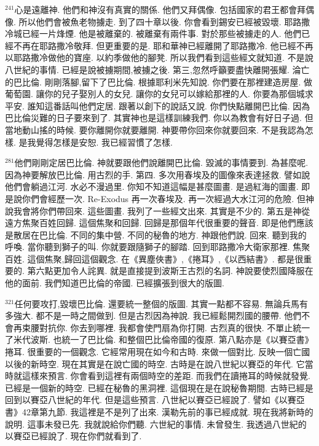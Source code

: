 \documentclass{book}
\begin{document}
$^{241}$心是遠離神.
他們和神沒有真實的關係.
他們又拜偶像.
包括國家的君王都會拜偶像.
所以他們會被魚老物擄走.
到了四十章以後.
你會看到錫安已經被毀壞.
耶路撒冷城已經一片烽煙.
他是被離棄的.
被離棄有兩件事.
對於那些被擄走的人.
他們已經不再在耶路撒冷敬拜.
但更重要的是.
耶和華神已經離開了耶路撒冷.
他已經不再以耶路撒冷做他的寶座.
以約季做他的腳凳.
所以我們看到這些經文就知道.
不是說八世紀的事情.
已經是說被擄期間,被擄之後.
第三,忽然呼籲要盡快離開張耀.
淪亡的巴比倫.
剛剛落腳,留下了巴比倫.
根據耶利米先知說.
你們要在那裡建造房屋.
做葡萄園.
讓你的兒子娶別人的女兒.
讓你的女兒可以嫁給那裡的人.
你要為那個城求平安.
誰知這番話叫他們定居.
跟著以創下的說話又說.
你們快點離開巴比倫.
因為巴比倫災難的日子要來到了.
其實神也是這樣訓練我們.
你以為教會有好日子過.
但當地動山搖的時候.
要你離開你就要離開.
神要帶你回來你就要回來.
不是我認為怎樣.
是我覺得怎樣是安恕.
我已經習慣了怎樣.

$^{281}$他們剛剛定居巴比倫.
神就要跟他們說離開巴比倫.
毀滅的事情要到.
為甚麼呢.
因為神要解放巴比倫.
用古烈的手.
第四.
多次用春埃及的圖像來表達拯救.
譬如說他們會躺過江河.
水必不漫過里.
你知不知道這幅是甚麼圖畫.
是過紅海的圖畫.
即是說你們會經歷一次.
Re-Exodus 再一次春埃及.
再一次經過大水江河的危險.
但神說我會將你們帶回來.
這些圖畫.
我列了一些經文出來.
其實是不少的.
第五是神從遠方焦聚百姓回歸.
這個焦聚和回歸.
回歸是那個年代很重要的聲音.
即是他們應該是散居在巴比倫.
不同的集中營.
不同的秘魯的地方.
神跟他們說.
回來.
聽到我的呼喚.
當你聽到獅子的叫.
你就要跟隨獅子的腳踏.
回到耶路撒冷大衛家那裡.
焦聚百姓.
這個焦聚,歸回這個觀念.
在《異塵俠書》,《捲耳》,《以西結書》.
都是很重要的.
第六點更加令人詫異.
就是直接提到波斯王古烈的名詞.
神說要使烈國降服在他的面前.
我們知道巴比倫的帝國.
已經擴張到很大的版圖.

$^{321}$任何要攻打,毀壞巴比倫.
還要統一整個的版圖.
其實一點都不容易.
無論兵馬有多強大.
都不是一時之間做到.
但是古烈因為神說.
我已經鬆開烈國的腰帶.
他們不會再束腰對抗你.
你去到哪裡.
我都會使門扇為你打開.
古烈真的很快.
不單止統一了米代波斯.
也統一了巴比倫.
和整個巴比倫帝國的復原.
第八點亦是《以賽亞書》捲耳.
很重要的一個觀念.
它經常用現在如今和古時.
來做一個對比.
反映一個亡國以後的新時空.
現在其實是在說亡國的時空.
古時是在說八世紀以賽亞的年代.
它當時就這樣來預言.
你會看到這裡有兩個時空的差距.
而我們在讀捲耳的時候就發覺.
已經是一個新的時空.
已經在秘魯的黑洞裡.
這個現在是在說秘魯期間.
古時已經是回到以賽亞八世紀的年代.
但是這些預言.
八世紀以賽亞已經說了.
譬如《以賽亞書》42章第九節.
我這裡是不是列了出來.
漢勒先前的事已經成就.
現在我將新時的說明.
這事未發已先.
我就說給你們聽.
六世紀的事情.
未曾發生.
我透過八世紀的以賽亞已經說了.
現在你們就看到了.
\end{document}
